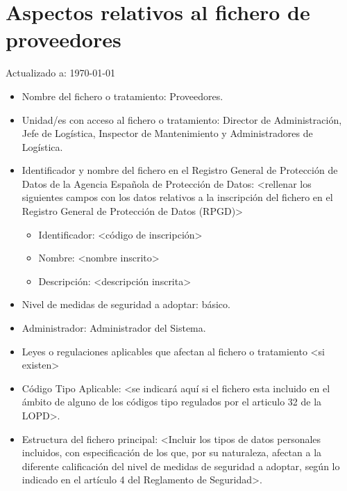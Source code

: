 \documentclass[a4paper,11pt,bibtotoc,noliststotoc]{scrbook}
\begin{document}
\section{Aspectos relativos al fichero de proveedores}


Actualizado a: \today

\begin{itemize}
\item Nombre del fichero o tratamiento: Proveedores.

\item Unidad/es con acceso al fichero o tratamiento: Director de Administración, Jefe de Logística, Inspector de Mantenimiento y Administradores de Logística.

\item Identificador y nombre del fichero en el Registro General de Protección de Datos de la Agencia Española de Protección de Datos: <rellenar los siguientes campos con los datos relativos a la inscripción del fichero en el Registro General de Protección de Datos (RPGD)>
	\begin{itemize}
	\item Identificador: <código de inscripción>
	\item Nombre: <nombre inscrito>
	\item Descripción: <descripción inscrita>
	\end{itemize}

\item Nivel de medidas de seguridad a adoptar: básico.

\item Administrador: Administrador del Sistema.

\item Leyes o regulaciones aplicables que afectan al fichero o tratamiento <si existen>

\item Código Tipo Aplicable: <se indicará aquí si el fichero esta incluido en el ámbito de alguno de los códigos tipo regulados por el articulo 32 de la LOPD>.

\item Estructura del fichero principal: <Incluir los tipos de datos personales incluidos, con especificación de los que, por su naturaleza, afectan a la diferente calificación del nivel de medidas de seguridad a adoptar, según lo indicado en el artículo 4 del Reglamento de Seguridad>.


\end{itemize}
\end{document}
